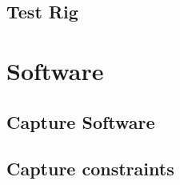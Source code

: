 \subsection{Test Rig}\label{sec:test.rig}

\section{Software}

\subsection{Capture Software}

\subsection{Capture constraints}